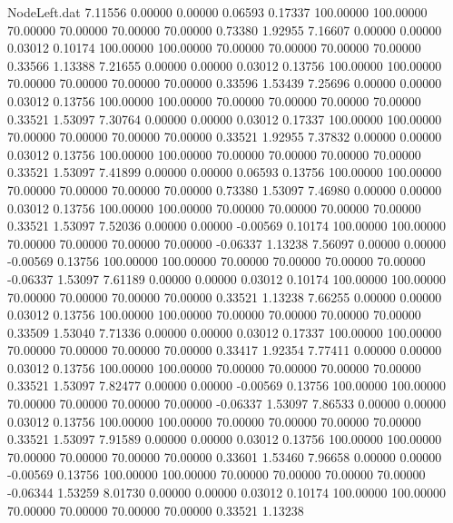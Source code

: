 \begin{filecontents}{NodeLeft.dat}
   7.11556    0.00000    0.00000     0.06593    0.17337  100.00000  100.00000   70.00000   70.00000   70.00000   70.00000    0.73380    1.92955
   7.16607    0.00000    0.00000     0.03012    0.10174  100.00000  100.00000   70.00000   70.00000   70.00000   70.00000    0.33566    1.13388
   7.21655    0.00000    0.00000     0.03012    0.13756  100.00000  100.00000   70.00000   70.00000   70.00000   70.00000    0.33596    1.53439
   7.25696    0.00000    0.00000     0.03012    0.13756  100.00000  100.00000   70.00000   70.00000   70.00000   70.00000    0.33521    1.53097
   7.30764    0.00000    0.00000     0.03012    0.17337  100.00000  100.00000   70.00000   70.00000   70.00000   70.00000    0.33521    1.92955
   7.37832    0.00000    0.00000     0.03012    0.13756  100.00000  100.00000   70.00000   70.00000   70.00000   70.00000    0.33521    1.53097
   7.41899    0.00000    0.00000     0.06593    0.13756  100.00000  100.00000   70.00000   70.00000   70.00000   70.00000    0.73380    1.53097
   7.46980    0.00000    0.00000     0.03012    0.13756  100.00000  100.00000   70.00000   70.00000   70.00000   70.00000    0.33521    1.53097
   7.52036    0.00000    0.00000    -0.00569    0.10174  100.00000  100.00000   70.00000   70.00000   70.00000   70.00000   -0.06337    1.13238
   7.56097    0.00000    0.00000    -0.00569    0.13756  100.00000  100.00000   70.00000   70.00000   70.00000   70.00000   -0.06337    1.53097
   7.61189    0.00000    0.00000     0.03012    0.10174  100.00000  100.00000   70.00000   70.00000   70.00000   70.00000    0.33521    1.13238
   7.66255    0.00000    0.00000     0.03012    0.13756  100.00000  100.00000   70.00000   70.00000   70.00000   70.00000    0.33509    1.53040
   7.71336    0.00000    0.00000     0.03012    0.17337  100.00000  100.00000   70.00000   70.00000   70.00000   70.00000    0.33417    1.92354
   7.77411    0.00000    0.00000     0.03012    0.13756  100.00000  100.00000   70.00000   70.00000   70.00000   70.00000    0.33521    1.53097
   7.82477    0.00000    0.00000    -0.00569    0.13756  100.00000  100.00000   70.00000   70.00000   70.00000   70.00000   -0.06337    1.53097
   7.86533    0.00000    0.00000     0.03012    0.13756  100.00000  100.00000   70.00000   70.00000   70.00000   70.00000    0.33521    1.53097
   7.91589    0.00000    0.00000     0.03012    0.13756  100.00000  100.00000   70.00000   70.00000   70.00000   70.00000    0.33601    1.53460
   7.96658    0.00000    0.00000    -0.00569    0.13756  100.00000  100.00000   70.00000   70.00000   70.00000   70.00000   -0.06344    1.53259
   8.01730    0.00000    0.00000     0.03012    0.10174  100.00000  100.00000   70.00000   70.00000   70.00000   70.00000    0.33521    1.13238

\end{filecontents}
